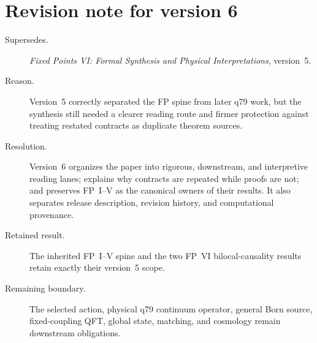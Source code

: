 \documentclass[11pt]{article}
\begin{document}
\section*{Revision note for version 6}
\begin{description}
\item[Supersedes.] \emph{Fixed Points VI: Formal Synthesis and Physical
Interpretations}, version~5.
\item[Reason.] Version~5 correctly separated the FP spine from later q79
work, but the synthesis still needed a clearer reading route and firmer
protection against treating restated contracts as duplicate theorem sources.
\item[Resolution.] Version~6 organizes the paper into rigorous, downstream,
and interpretive reading lanes; explains why contracts are repeated while
proofs are not; and preserves FP~I--V as the canonical owners of their
results. It also separates release description, revision history, and
computational provenance.
\item[Retained result.] The inherited FP~I--V spine and the two FP~VI
bilocal-causality results retain exactly their version~5 scope.
\item[Remaining boundary.] The selected action, physical q79 continuum
operator, general Born source, fixed-coupling QFT, global state, matching, and
cosmology remain downstream obligations.
\end{description}
\end{document}
